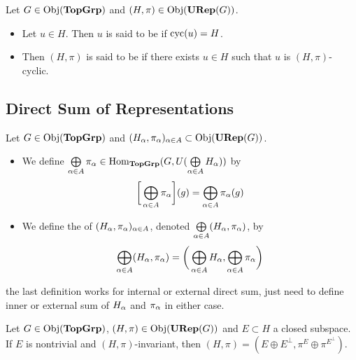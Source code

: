 \documentclass{book}
\begin{document}
	\begin{defn}
		Let $G \in \operatorname{Obj}(\operatorname*{\text{\textbf{TopGrp}}})$ and $(H, \pi) \in \operatorname{Obj}(\operatorname*{\text{\textbf{URep}}}(G))$. 
		\begin{itemize}
			\item Let $u \in H$. Then $u$ is said to be  if $\operatorname{cyc}(u) = H$. 
			\item Then $(H, \pi)$ is said to be  if there exists $u \in H$ such that $u$ is $(H, \pi)$-cyclic.
		\end{itemize}
	\end{defn}

	











	







	\subsection{Direct Sum of Representations}
	
	\begin{defn}
		Let $G \in \operatorname{Obj}(\operatorname*{\text{\textbf{TopGrp}}})$ and $(H_{\alpha}, \pi_{\alpha})_{\alpha \in A} \subset \operatorname{Obj}(\operatorname*{\text{\textbf{URep}}}(G))$. 
		\begin{itemize}
			\item We define $\bigoplus\limits_{\alpha \in A} \pi_{\alpha} \in \operatorname{Hom}_{\operatorname*{\text{\textbf{TopGrp}}}}(G, U(\bigoplus\limits_{\alpha \in A} H_{\alpha}))$ by 
			$$\bigg[ \bigoplus\limits_{\alpha \in A} \pi_{\alpha} \bigg](g) = \bigoplus\limits_{\alpha \in A} \pi_{\alpha}(g)$$
			\item We define the  of $(H_{\alpha}, \pi_{\alpha})_{\alpha \in A}$, denoted $\bigoplus\limits_{\alpha \in A} (H_{\alpha}, \pi_{\alpha})$, by 
			$$\bigoplus\limits_{\alpha \in A} (H_{\alpha}, \pi_{\alpha}) = \bigg(\bigoplus\limits_{\alpha \in A} H_{\alpha}, \bigoplus\limits_{\alpha \in A} \pi_{\alpha} \bigg)$$ 
		\end{itemize}
	\end{defn}

	\begin{note}
		 the last definition works for internal or external direct sum, just need to define inner or external sum of $H_{\alpha}$ and $\pi_{\alpha}$ in either case. 
	\end{note}

	\begin{ex}
		Let $G \in \operatorname{Obj}(\operatorname*{\text{\textbf{TopGrp}}})$, $(H, \pi) \in \operatorname{Obj}(\operatorname*{\text{\textbf{URep}}}(G))$ and $E \subset H$ a closed subspace. If $E$ is nontrivial and $(H, \pi)$-invariant, then $(H, \pi) = (E \oplus E^{\perp}, \pi^E \oplus \pi^{E^{\perp}})$.
	\end{ex}
	
\end{document}
